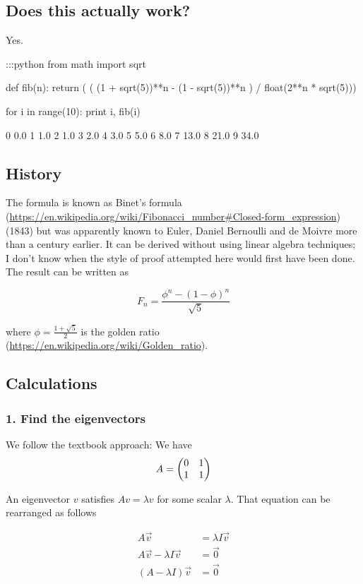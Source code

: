 \subsection*{Does this actually work?}

Yes.

    :::python
    from math import sqrt

    def fib(n):
        return (
            ( (1 + sqrt(5))**n - (1 - sqrt(5))**n )
            /
            float(2**n * sqrt(5)))

    for i in range(10):
        print i, fib(i)

    0 0.0
    1 1.0
    2 1.0
    3 2.0
    4 3.0
    5 5.0
    6 8.0
    7 13.0
    8 21.0
    9 34.0

\subsection*{History}

The formula is known as
Binet's formula (\url{https://en.wikipedia.org/wiki/Fibonacci_number#Closed-form_expression})
(1843) but was apparently known to Euler, Daniel Bernoulli and de Moivre more
than a century earlier. It can be derived without using linear algebra
techniques; I don't know when the style of proof attempted here would first
have been done. The result can be written as

$$
F_n = \frac{\phi^n - (1-\phi)^n}{\sqrt{5}}
$$

where $\phi = \frac{1+\sqrt{5}}{2}$ is the
golden ratio (\url{https://en.wikipedia.org/wiki/Golden_ratio}).


\subsection*{Calculations}

\subsubsection{1. Find the eigenvectors}
We follow the textbook approach: We have
$$
A = \begin{pmatrix}0 & 1\\1 & 1\\ \end{pmatrix}
$$

An eigenvector $v$ satisfies $Av = \lambda v$ for some scalar $\lambda$. That
equation can be rearranged as follows

\begin{align*}
A\vec v &= \lambda I\vec v
\\
A\vec v - \lambda I\vec v &= \vec 0
\\
(A - \lambda I)\vec v &= \vec 0
\end{align*}

